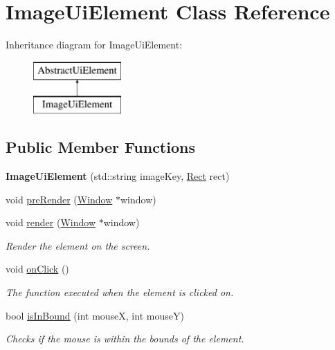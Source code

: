 \hypertarget{class_image_ui_element}{}\section{Image\+Ui\+Element Class Reference}
\label{class_image_ui_element}
Inheritance diagram for Image\+Ui\+Element\+:\begin{figure}[H]
\begin{center}
\leavevmode
\includegraphics[height=2.000000cm]{class_image_ui_element}
\end{center}
\end{figure}
\subsection*{Public Member Functions}
\begin{DoxyCompactItemize}
\item 
\mbox{\label{class_image_ui_element_adf89065965433525ea37f925be46cafa}} 
{\bfseries Image\+Ui\+Element} (std\+::string image\+Key, \mbox{\hyperlink{struct_rect}{Rect}} rect)
\item 
void \mbox{\hyperlink{class_image_ui_element_a15c523c82400b74f2f5713c6510f8c7a}{pre\+Render}} (\mbox{\hyperlink{class_window}{Window}} $\ast$window)
\item 
void \mbox{\hyperlink{class_image_ui_element_af0928d725565618d6a9c8a2f557c1709}{render}} (\mbox{\hyperlink{class_window}{Window}} $\ast$window)
\begin{DoxyCompactList}\small\item\em Render the element on the screen. \end{DoxyCompactList}\item 
void \mbox{\hyperlink{class_image_ui_element_ab3c388de0807d86016a2ff43fd6d337e}{on\+Click}} ()
\begin{DoxyCompactList}\small\item\em The function executed when the element is clicked on. \end{DoxyCompactList}\item 
bool \mbox{\hyperlink{class_image_ui_element_a6d0f66cf68c5f035f5a9bfeaba3028f4}{is\+In\+Bound}} (int mouseX, int mouseY)
\begin{DoxyCompactList}\small\item\em Checks if the mouse is within the bounds of the element. \end{DoxyCompactList}\end{DoxyCompactItemize}
